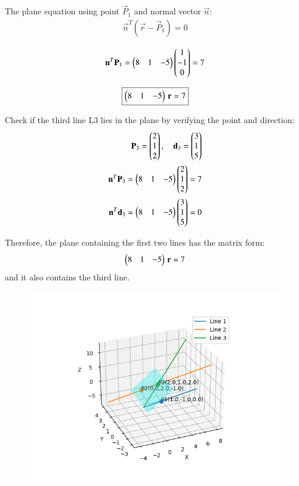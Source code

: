 \documentclass[journal]{IEEEtran}
\begin{document}
\noindent The plane equation using point \(\vec{P}_1\) and normal vector \(\vec{n}\):
\begin{align}
\vec{n}^T(\vec{r} - \vec{P}_1) = 0
\end{align}

\begin{align}
\mathbf{n}^T \mathbf{P}_1 = \begin{pmatrix}8 & 1 & -5\end{pmatrix}\begin{pmatrix}1\\-1\\0\end{pmatrix} = 7
\end{align}

\begin{align}
\boxed{\begin{pmatrix}8 & 1 & -5\end{pmatrix}\,\mathbf{r} = 7}
\end{align}

\noindent Check if the third line L3 lies in the plane by verifying the point and direction:
\begin{align}
\mathbf{P}_3 = \begin{pmatrix}2\\1\\2\end{pmatrix}, \quad \mathbf{d}_3 = \begin{pmatrix}3\\1\\5\end{pmatrix} \\
\mathbf{n}^T \mathbf{P}_3 = \begin{pmatrix}8 & 1 & -5\end{pmatrix}\begin{pmatrix}2\\1\\2\end{pmatrix} = 7 \\
\mathbf{n}^T \mathbf{d}_3 = \begin{pmatrix}8 & 1 & -5\end{pmatrix}\begin{pmatrix}3\\1\\5\end{pmatrix} = 0
\end{align}

\noindent Therefore, the plane containing the first two lines has the matrix form:
\[
\begin{pmatrix}8 & 1 & -5\end{pmatrix}\,\mathbf{r} = 7
\]  
and it also contains the third line.

\begin{figure}[H]
    \centering
    \includegraphics[width=0.5\columnwidth]{figs/fig1.png}
    \caption{}
    \label{fig:placeholder}
\end{figure}
\end{document}
